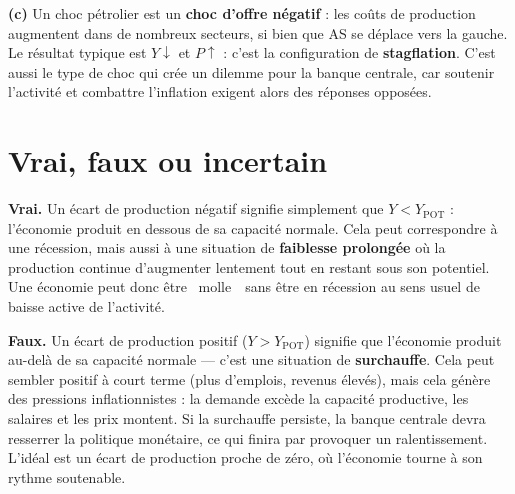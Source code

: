 \begin{reponse}
\textbf{(c)} Un choc pétrolier est un \textbf{choc d'offre négatif} : les coûts de production augmentent dans de nombreux secteurs, si bien que AS se déplace vers la gauche. Le résultat typique est $Y \downarrow$ et $P \uparrow$ : c'est la configuration de \textbf{stagflation}. C'est aussi le type de choc qui crée un dilemme pour la banque centrale, car soutenir l'activité et combattre l'inflation exigent alors des réponses opposées.
\end{reponse}

\section{Vrai, faux ou incertain}

\setcounter{shortcounter}{0}


\begin{reponse}
\textbf{Vrai.} Un écart de production négatif signifie simplement que $Y < Y_{\text{POT}}$ : l'économie produit en dessous de sa capacité normale. Cela peut correspondre à une récession, mais aussi à une situation de \textbf{faiblesse prolongée} où la production continue d'augmenter lentement tout en restant sous son potentiel. Une économie peut donc être \guillemotleft~molle~\guillemotright\ sans être en récession au sens usuel de baisse active de l'activité.
\end{reponse}


\begin{reponse}
\textbf{Faux.} Un écart de production positif ($Y > Y_{\text{POT}}$) signifie que l'économie produit au-delà de sa capacité normale --- c'est une situation de \textbf{surchauffe}. Cela peut sembler positif à court terme (plus d'emplois, revenus élevés), mais cela génère des pressions inflationnistes : la demande excède la capacité productive, les salaires et les prix montent. Si la surchauffe persiste, la banque centrale devra resserrer la politique monétaire, ce qui finira par provoquer un ralentissement. L'idéal est un écart de production proche de zéro, où l'économie tourne à son rythme soutenable.
\end{reponse}

